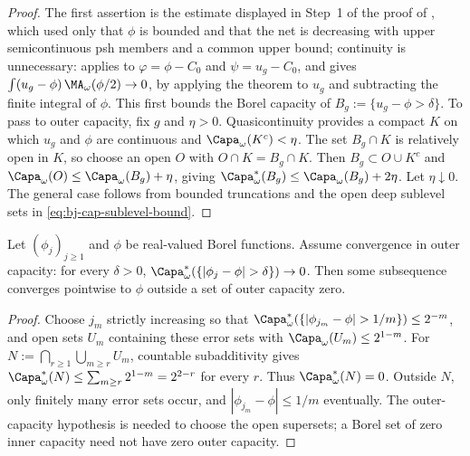 \begin{proof}
The first assertion is the estimate displayed in Step~1 of the proof of
, which used only that $\phi$ is bounded and
that the net is decreasing with upper semicontinuous psh members
and a common upper bound; continuity is unnecessary:  applies to
$\varphi=\phi-C_0$ and $\psi=u_g-C_0$, and
 gives
$\int(u_g-\phi)\,\MA_\omega(\phi/2)\to0$, by applying the theorem
to $u_g$ and subtracting the finite integral of $\phi$.
This first bounds the Borel capacity of $B_g:=\{u_g-\phi>\delta\}$.
To pass to outer capacity, fix $g$ and $\eta>0$. Quasicontinuity
provides a compact $K$ on which $u_g$ and $\phi$ are continuous and
$\Capa_\omega(K^c)<\eta$. The set $B_g\cap K$ is relatively open
in $K$, so choose an open $O$ with $O\cap K=B_g\cap K$.
Then $B_g\subset O\cup K^c$ and
$\Capa_\omega(O)\le\Capa_\omega(B_g)+\eta$, giving
$\Capa^*_\omega(B_g)\le\Capa_\omega(B_g)+2\eta$.
Let $\eta\downarrow0$. The general case follows from bounded
truncations and the open deep sublevel sets in
\eqref{eq:bj-cap-sublevel-bound}.
\end{proof}

\begin{proposition}
\label{prop:ch48-capacity-subsequence}
Let $(\phi_j)_{j\ge1}$ and $\phi$ be real-valued Borel functions.
Assume convergence in outer capacity: for every $\delta>0$,
$\Capa^*_\omega(\{|\phi_j-\phi|>\delta\})\to0$.
Then some subsequence converges pointwise to $\phi$ outside a set
of outer capacity zero.
\end{proposition}

\begin{proof}
Choose $j_m$ strictly increasing so that
$\Capa^*_\omega(\{|\phi_{j_m}-\phi|>1/m\})\le2^{-m}$, and open
sets $U_m$ containing these error sets with
$\Capa_\omega(U_m)\le2^{1-m}$.
For $N:=\bigcap_{r\ge1}\bigcup_{m\ge r}U_m$, countable subadditivity gives
$\Capa^*_\omega(N)\le\sum_{m\ge r}2^{1-m}=2^{2-r}$ for every $r$.
Thus $\Capa^*_\omega(N)=0$. Outside $N$, only finitely many error
sets occur, and $|\phi_{j_m}-\phi|\le1/m$ eventually.
The outer-capacity hypothesis is needed to choose the open supersets;
a Borel set of zero inner capacity need not have zero outer capacity.
\end{proof}

